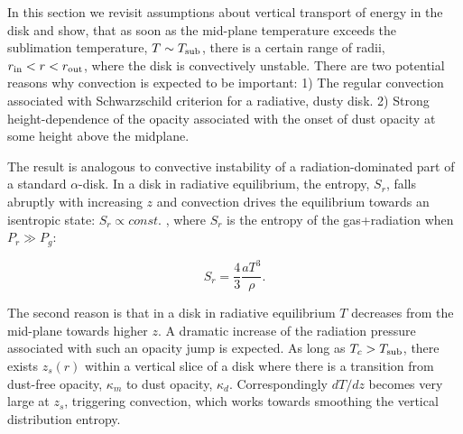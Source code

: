 \documentclass[12pt,english,preprint]{aastex}
\newcommand{\Tc}{T}
\begin{document}
In this section we revisit assumptions about vertical transport of
energy in the disk 
and show, that as soon as the mid-plane 
temperature exceeds the sublimation temperature, $\Tc \sim T_{{\rm sub}}$, there is a certain range of radii, 
$r_{{\rm in}}<r<r_{{\rm out}}$, where the disk is convectively unstable. There are two potential reasons why
convection is expected to be important: 1) The regular convection
associated with Schwarzschild criterion for a radiative, dusty disk. 2) Strong height-dependence of the opacity associated with the onset of dust opacity at some height above the midplane.


The result is analogous to convective instability of a radiation-dominated 
part of a standard $\alpha$-disk. 
In a disk in radiative equilibrium, the entropy, $S_r$, falls abruptly with increasing $z$ and
convection drives the equilibrium towards an isentropic
state: $S_{r}\propto const.$ \citep{BKBlinn77}, where $S_{r}$ is
the entropy of the gas+radiation when $P_r\gg P_{g}$:

\begin{equation}
S_{r}=\frac{4}{3}\frac{aT^{3}}{\rho}\mbox{.}\label{eq:EntropyRad}
\end{equation}

The second reason is that in a disk in radiative equilibrium 
$T$ decreases from the mid-plane towards higher $z$.
A dramatic increase of the radiation pressure associated
with such an opacity jump is expected. 
As long as $T_{c}>T_{{\rm sub}}$,
there exists $z_{s}(r)$ within a vertical slice of a disk where there
is a transition from dust-free opacity, $\kappa_{m}$ to dust opacity,
$\kappa_{d}$. Correspondingly $dT/dz$ becomes very large at $z_{s}$, 
triggering convection, which works towards smoothing the vertical distribution 
entropy.
\end{document}
